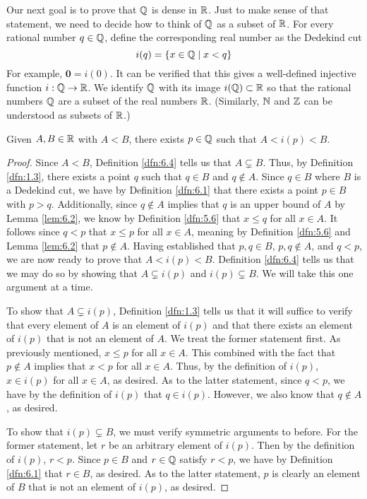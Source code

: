 \documentclass[../main.tex]{subfiles}
\begin{document}
Our next goal is to prove that $\mathbb{Q}$ is dense in $\mathbb{R}$. Just to make sense of that statement, we need to decide how to think of $\mathbb{Q}$ as a subset of $\mathbb{R}$. For every rational number $q\in\mathbb{Q}$, define the corresponding real number as the Dedekind cut
\begin{equation*}
    i(q) = \{x\in\mathbb{Q}\mid x<q\}
\end{equation*}
For example, $\bm{0}=i(0)$. It can be verified that this gives a well-defined injective function $i:\mathbb{Q}\to\mathbb{R}$. We identify $\mathbb{Q}$ with its image $i(\mathbb{Q})\subset\mathbb{R}$ so that the rational numbers $\mathbb{Q}$ are a subset of the real numbers $\mathbb{R}$. (Similarly, $\mathbb{N}$ and $\mathbb{Z}$ can be understood as subsets of $\mathbb{R}$.)
\pagebreak

\begin{lemma}\label{lem:6.10}
    Given $A,B\in\mathbb{R}$ with $A<B$, there exists $p\in\mathbb{Q}$ such that $A<i(p)<B$.
    \begin{proof}
        Since $A<B$, Definition \ref{dfn:6.4} tells us that $A\subsetneq B$. Thus, by Definition \ref{dfn:1.3}, there exists a point $q$ such that $q\in B$ and $q\notin A$. Since $q\in B$ where $B$ is a Dedekind cut, we have by Definition \ref{dfn:6.1} that there exists a point $p\in B$ with $p>q$. Additionally, since $q\notin A$ implies that $q$ is an upper bound of $A$ by Lemma \ref{lem:6.2}, we know by Definition \ref{dfn:5.6} that $x\leq q$ for all $x\in A$. It follows since $q<p$ that $x\leq p$ for all $x\in A$, meaning by Definition \ref{dfn:5.6} and Lemma \ref{lem:6.2} that $p\notin A$. Having established that $p,q\in B$, $p,q\notin A$, and $q<p$, we are now ready to prove that $A<i(p)<B$. Definition \ref{dfn:6.4} tells us that we may do so by showing that $A\subsetneq i(p)$ and $i(p)\subsetneq B$. We will take this one argument at a time.\par
        To show that $A\subsetneq i(p)$, Definition \ref{dfn:1.3} tells us that it will suffice to verify that every element of $A$ is an element of $i(p)$ and that there exists an element of $i(p)$ that is not an element of $A$. We treat the former statement first. As previously mentioned, $x\leq p$ for all $x\in A$. This combined with the fact that $p\notin A$ implies that $x<p$ for all $x\in A$. Thus, by the definition of $i(p)$, $x\in i(p)$ for all $x\in A$, as desired. As to the latter statement, since $q<p$, we have by the definition of $i(p)$ that $q\in i(p)$. However, we also know that $q\notin A$, as desired.\par
        To show that $i(p)\subsetneq B$, we must verify symmetric arguments to before. For the former statement, let $r$ be an arbitrary element of $i(p)$. Then by the definition of $i(p)$, $r<p$. Since $p\in B$ and $r\in\mathbb{Q}$ satisfy $r<p$, we have by Definition \ref{dfn:6.1} that $r\in B$, as desired. As to the latter statement, $p$ is clearly an element of $B$ that is not an element of $i(p)$, as desired.
    \end{proof}
\end{lemma}
\end{document}
